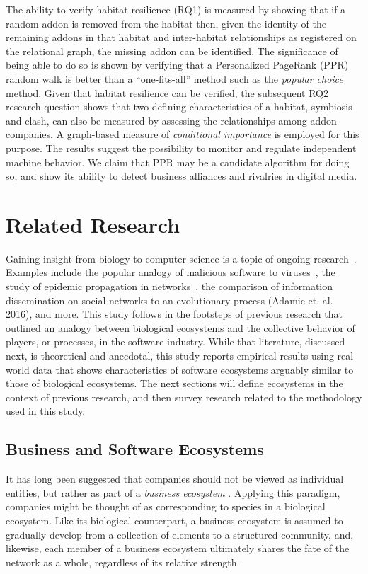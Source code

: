 \documentclass[10pt,letterpaper]{article}
\begin{document}
The ability to verify habitat resilience (RQ1) is measured by showing that if a random addon is removed from the habitat then, given the identity of the remaining addons in that habitat and inter-habitat relationships as registered on the relational graph, the missing addon can be identified. The significance of being able to do so is shown by verifying that a Personalized PageRank (PPR) random walk is better than a ``one-fits-all'' method such as the \textit{popular choice} method. Given that habitat resilience can be verified, the subsequent RQ2 research question shows that two defining characteristics of a habitat, symbiosis and clash, can also be measured by assessing the relationships among addon companies. A graph-based measure of \textit{conditional importance} is employed for this purpose. The results suggest the possibility to monitor and regulate independent machine behavior. We claim that PPR may be a candidate algorithm for doing so, and show its ability to detect business alliances and rivalries in digital media. 

\section*{Related Research}

Gaining insight from biology to computer science is a topic of ongoing research~\cite{rasmus2015computational}. Examples include the popular analogy of malicious software to viruses~\cite{cohen1987computer}, the study of epidemic propagation in networks~\cite{christosKAIS14}, the comparison of information dissemination on social networks to an evolutionary process (Adamic et. al. 2016), and more. This study follows in the footsteps of previous research that outlined an analogy between biological ecosystems and the collective behavior of players, or processes, in the software industry. While that literature, discussed next, is theoretical and anecdotal, this study reports empirical results using real-world data that shows characteristics of software ecosystems arguably similar to those of biological ecosystems. The next sections will define ecosystems in the context of previous research, and then survey research related to the methodology used in this study.

\subsection*{Business and Software Ecosystems}

It has long been suggested that companies should not be viewed as individual entities, but rather as part of a \textit{business ecosystem} \cite{moore93,iansiti04}. Applying this paradigm, companies might be thought of as corresponding to species in a biological ecosystem. Like its biological counterpart, a business ecosystem is assumed to gradually develop from a collection of elements to a structured community, and, likewise, each member of a business ecosystem ultimately shares the fate of the network as a whole, regardless of its relative strength. 
\end{document}
